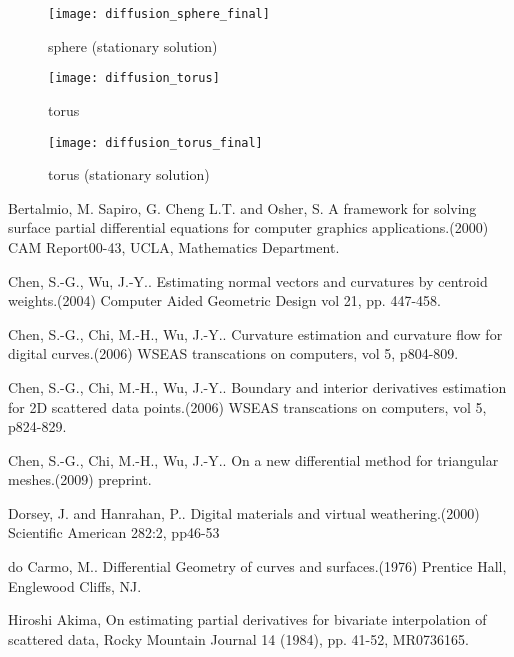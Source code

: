 \documentclass{elsart}
\begin{document}
\begin{figure}
{\center
\texttt{[image: diffusion\_sphere\_final]}
\caption{sphere (stationary solution) }
\label{diffusion_sphere_final}
 }
\end{figure}

\begin{figure}
{\center
\texttt{[image: diffusion\_torus]}
\caption{torus}\label{diffusion_torus}
 }
\end{figure}


\begin{figure}
{\center
\texttt{[image: diffusion\_torus\_final]}
\caption{torus (stationary solution)}\label{diffusion_torus_final}
 }
\end{figure}




\begin{thebibliography}{00}

 Bertalmio, M. Sapiro, G. Cheng L.T. and Osher, S. A
framework for solving surface partial differential equations for
computer graphics applications.(2000) CAM Report00-43, UCLA,
Mathematics Department.

 Chen, S.-G., Wu, J.-Y.. Estimating normal vectors and
curvatures by centroid weights.(2004) Computer Aided Geometric
Design vol 21, pp. 447-458.

 Chen, S.-G., Chi, M.-H., Wu, J.-Y.. Curvature
estimation and curvature flow for digital curves.(2006) WSEAS
transcations on computers, vol 5, p804-809.

 Chen, S.-G., Chi, M.-H., Wu, J.-Y.. Boundary and interior
derivatives estimation for 2D scattered data points.(2006) WSEAS
transcations on computers, vol 5, p824-829.

 Chen, S.-G., Chi, M.-H., Wu, J.-Y.. On a new differential method for triangular
meshes.(2009) preprint.



 Dorsey, J. and Hanrahan, P.. Digital materials and virtual
weathering.(2000) Scientific American 282:2, pp46-53


 do Carmo, M.. Differential Geometry of curves and
surfaces.(1976) Prentice Hall, Englewood Cliffs, NJ.

 Hiroshi Akima, On estimating partial derivatives for bivariate interpolation of
scattered data, Rocky Mountain Journal 14 (1984), pp. 41-52,
MR0736165.



\end{thebibliography}
\end{document}
